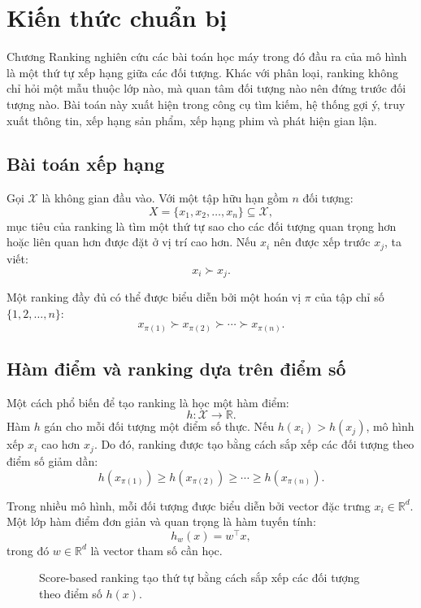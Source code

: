 \section{Kiến thức chuẩn bị}
\label{sec:kien-thuc-chuan-bi}

Chương Ranking nghiên cứu các bài toán học máy trong đó đầu ra của mô hình là một thứ tự xếp hạng giữa các đối tượng. Khác với phân loại, ranking không chỉ hỏi một mẫu thuộc lớp nào, mà quan tâm đối tượng nào nên đứng trước đối tượng nào. Bài toán này xuất hiện trong công cụ tìm kiếm, hệ thống gợi ý, truy xuất thông tin, xếp hạng sản phẩm, xếp hạng phim và phát hiện gian lận.

\subsection{Bài toán xếp hạng}

Gọi \(\mathcal{X}\) là không gian đầu vào. Với một tập hữu hạn gồm \(n\) đối tượng:
\[
    X=\{x_1,x_2,\ldots,x_n\}\subseteq \mathcal{X},
\]
mục tiêu của ranking là tìm một thứ tự sao cho các đối tượng quan trọng hơn hoặc liên quan hơn được đặt ở vị trí cao hơn. Nếu \(x_i\) nên được xếp trước \(x_j\), ta viết:
\[
    x_i \succ x_j.
\]

Một ranking đầy đủ có thể được biểu diễn bởi một hoán vị \(\pi\) của tập chỉ số \(\{1,2,\ldots,n\}\):
\[
    x_{\pi(1)} \succ x_{\pi(2)} \succ \cdots \succ x_{\pi(n)}.
\]

\subsection{Hàm điểm và ranking dựa trên điểm số}

Một cách phổ biến để tạo ranking là học một hàm điểm:
\[
    h:\mathcal{X}\rightarrow\mathbb{R}.
\]
Hàm \(h\) gán cho mỗi đối tượng một điểm số thực. Nếu \(h(x_i)>h(x_j)\), mô hình xếp \(x_i\) cao hơn \(x_j\). Do đó, ranking được tạo bằng cách sắp xếp các đối tượng theo điểm số giảm dần:
\[
    h(x_{\pi(1)})\geq h(x_{\pi(2)})\geq \cdots \geq h(x_{\pi(n)}).
\]

Trong nhiều mô hình, mỗi đối tượng được biểu diễn bởi vector đặc trưng \(x_i\in\mathbb{R}^d\). Một lớp hàm điểm đơn giản và quan trọng là hàm tuyến tính:
\[
    h_w(x)=w^\top x,
\]
trong đó \(w\in\mathbb{R}^d\) là vector tham số cần học.

\begin{figure}[H]
    \centering
    \caption{Score-based ranking tạo thứ tự bằng cách sắp xếp các đối tượng theo điểm số \(h(x)\).}
    \label{fig:section2-score-axis-ranking-short}
\end{figure}

